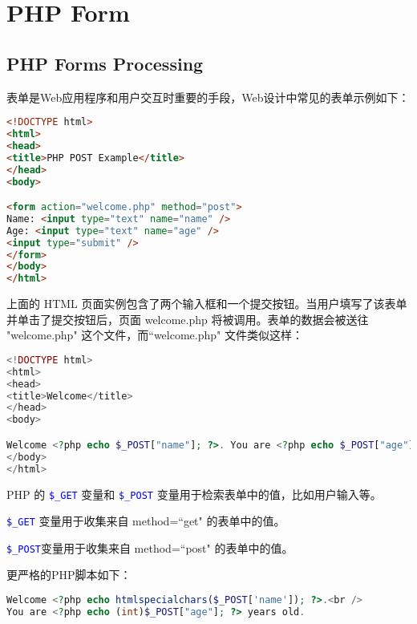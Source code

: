 \part{PHP Form}







\chapter{PHP Forms Processing}

\vspace{-30pt}

表单是Web应用程序和用户交互时重要的手段，Web设计中常见的表单示例如下：

\begin{lstlisting}[language=HTML]
<!DOCTYPE html>
<html>
<head>
<title>PHP POST Example</title>
</head>
<body>

<form action="welcome.php" method="post">
Name: <input type="text" name="name" />
Age: <input type="text" name="age" />
<input type="submit" />
</form>
</body>
</html>
\end{lstlisting}




上面的 HTML 页面实例包含了两个输入框和一个提交按钮。当用户填写了该表单并单击了提交按钮后，页面 welcome.php 将被调用。表单的数据会被送往 "welcome.php" 这个文件，而``welcome.php" 文件类似这样：

\begin{lstlisting}[language=PHP]
<!DOCTYPE html>
<html>
<head>
<title>Welcome</title>
</head>
<body>

Welcome <?php echo $_POST["name"]; ?>. You are <?php echo $_POST["age"]; ?> years old.
</body>
</html>
\end{lstlisting}

PHP 的 \textcolor{Blue}{\texttt{\$\_GET}} 变量和 \textcolor{Blue}{\texttt{\$\_POST}} 变量用于检索表单中的值，比如用户输入等。

\begin{compactitem}
\item \textcolor{Blue}{\texttt{\$\_GET}} 变量用于收集来自 method=``get" 的表单中的值。
\item \textcolor{Blue}{\texttt{\$\_POST}}变量用于收集来自 method=``post" 的表单中的值。
\end{compactitem}

更严格的PHP脚本如下：

\begin{lstlisting}[language=PHP]
Welcome <?php echo htmlspecialchars($_POST['name']); ?>.<br />
You are <?php echo (int)$_POST["age"]; ?> years old.
\end{lstlisting}


